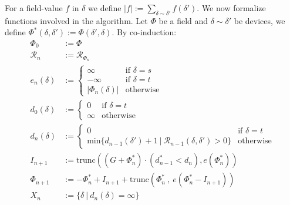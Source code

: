 \documentclass{article}
\theoremstyle{plain}
\theoremstyle{definition}
\theoremstyle{remark}
\begin{document}
For a field-value $f$ in $\delta$ we define $\displaystyle{|f|:=\sum_{\delta\sim\delta'}f(\delta')}$.
We now formalize functions involved in the algorithm. Let $\Phi$ be a field and $\delta\sim\delta'$ be  devices, we define $\Phi^*(\delta, \delta'):=\Phi(\delta', \delta)$.
By co-induction:
\begin{equation*}
\begin{split}
\Phi_0 &:= \Phi\\
\mathcal{R}_n&:= \mathcal{R}_{\Phi_n}\\
e_n(\delta)&:=
\begin{cases}
\infty &\text{if\ }\delta=s\\
-\infty &\text{if\ }\delta=t\\
|\Phi_n(\delta)| &\text{otherwise}
\end{cases}\\
d_0(\delta)&:=
\begin{cases} 
0 &\text{if\ }\delta=t\\
\infty&\text{otherwise}
\end{cases}\\
d_n(\delta)&:=
\begin{cases}
0 &\text{if\ }\delta=t\\
 \mathrm{min}\big\{d_{n-1}(\delta') + 1\ |\  \mathcal{R}_{n-1}(\delta, \delta')>0\big\}&\text{otherwise}
\end{cases}\\
I_{n+1}&:= \mathrm{trunc}((G + \Phi^*_n)\cdot(d_{n-1}^*<d_n),  e(\Phi_n^*))\\
\Phi_{n+1}&:= -\Phi_n^* + I_{n+1} + \mathrm{trunc}(\Phi_n^*\ ,\  e(\Phi_n^* - I_{n+1}))\\
X_n&:=\{\delta \ |\ d_n(\delta)=\infty\}
\end{split}
\end{equation*}
\end{document}
